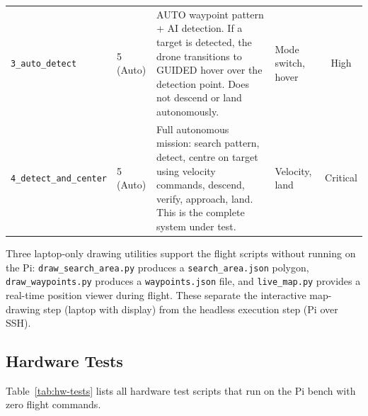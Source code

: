 \begin{table}[H]
\begin{tabular}{@{}llp{5.8cm}lc@{}}
\addlinespace
\texttt{3\_auto\_detect} & 5 (Auto) & AUTO waypoint pattern + AI detection.  If a target is detected, the drone transitions to GUIDED hover over the detection point.  Does not descend or land autonomously. & Mode switch, hover & High \\
\addlinespace
\texttt{4\_detect\_and\_center} & 5 (Auto) & Full autonomous mission: search pattern, detect, centre on target using velocity commands, descend, verify, approach, land.  This is the complete system under test. & Velocity, land & Critical \\
\bottomrule
\end{tabular}
\end{table}

Three laptop-only drawing utilities support the flight scripts without running on the Pi: \texttt{draw\_search\_area.py} produces a \texttt{search\_area.json} polygon, \texttt{draw\_waypoints.py} produces a \texttt{waypoints.json} file, and \texttt{live\_map.py} provides a real-time position viewer during flight.  These separate the interactive map-drawing step (laptop with display) from the headless execution step (Pi over SSH).

\subsection{Hardware Tests}\label{sec:hw-tests}

Table~\ref{tab:hw-tests} lists all hardware test scripts that run on the Pi bench with zero flight commands.

